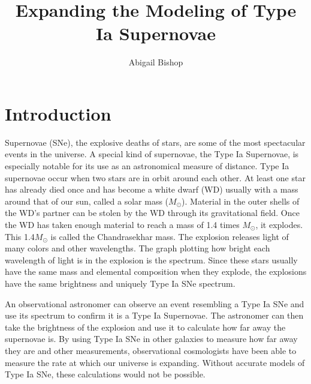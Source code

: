 \documentclass[11pt, oneside]{article}   	%
\title{Expanding the Modeling of Type Ia Supernovae}
\author{Abigail Bishop}
\begin{document}
\maketitle


\section{Introduction}

  
  
  
  Supernovae (SNe), the explosive deaths of stars, are some of the most spectacular events in the universe. A special kind of supernovae, the Type Ia Supernovae, is especially notable for its use as an astronomical measure of distance. Type Ia supernovae occur when two stars are in orbit around each other. At least one star has already died once and has become a white dwarf (WD) usually with a mass around that of our sun, called a solar mass ($M_{\odot}$). Material in the outer shells of the WD's partner can be stolen by the WD through its gravitational field. Once the WD has taken enough material to reach a mass of 1.4 times $M_{\odot}$, it explodes. This 1.4$M_{\odot}$ is called the Chandrasekhar mass. The explosion releases light of many colors and other wavelengths. The graph plotting how bright each wavelength of light is in the explosion is the spectrum. Since these stars usually have the same mass and elemental composition when they explode, the explosions have the same brightness and uniquely Type Ia SNe spectrum. 
  
  An observational astronomer can observe an event resembling a Type Ia SNe and use its spectrum to confirm it is a Type Ia Supernovae. The astronomer can then take the brightness of the explosion and use it to calculate how far away the supernovae is. By using Type Ia SNe in other galaxies to measure how far away they are and other measurements, observational cosmologists have been able to measure the rate at which our universe is expanding. Without accurate models of Type Ia SNe, these calculations would not be possible. 
  
\end{document}
